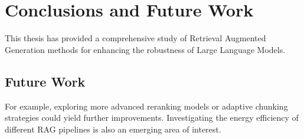 \chapter{Conclusions and Future Work}
\label{chap:conclusions}

This thesis has provided a comprehensive study of Retrieval Augmented Generation methods for enhancing the robustness of Large Language Models.

\section{Future Work}
For example, exploring more advanced reranking models or adaptive chunking strategies could yield further improvements. Investigating the energy efficiency of different RAG pipelines is also an emerging area of interest.